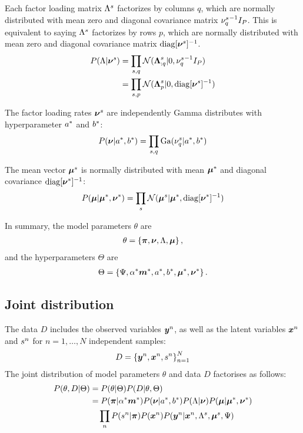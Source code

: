 \documentclass[a4paper]{article}
\begin{document}
Each factor loading matrix $\Lambda^s$ factorizes by columns $q$, which are normally distributed with mean zero and diagonal covariance matrix ${\nu^s_q}^{-1}I_P$. This is equivalent to saying $\Lambda^s$ factorizes by rows $p$, which are normally distributed with mean zero and diagonal covariance matrix $\operatorname{diag}[\boldsymbol{\nu}^s]^{-1}$.
\begin{align}
  P(\Lambda|\boldsymbol{\nu}^s)&=\prod_{s,q}\mathcal{N}(\boldsymbol{\Lambda}^s_{:q}|0,{\nu^s_q}^{-1}I_P) \\
                &=\prod_{s,p}\mathcal{N}(\boldsymbol{\Lambda}^s_p|0,\operatorname{diag}[\boldsymbol{\nu}^s]^{-1})
\end{align}

The factor loading rates $\boldsymbol{\nu}^s$ are independently Gamma distributes with hyperparameter $a^*$ and $b^*$:
\begin{align}
  P(\boldsymbol{\nu}|a^*,b^*)=\prod_{s,q}\operatorname{Ga}(\nu^s_q|a^*,b^*)
\end{align}

The mean vector $\boldsymbol{\mu}^s$ is normally distributed with mean $\boldsymbol{\mu}^*$ and diagonal covariance $\operatorname{diag}[\boldsymbol{\nu}^*]^{-1}$:
\begin{align}
  P(\boldsymbol{\mu}|\boldsymbol{\mu}^*,\boldsymbol{\nu}^*)=\prod_s\mathcal{N}(\boldsymbol{\mu}^s|\boldsymbol{\mu}^*,\operatorname{diag}[\boldsymbol{\nu}^*]^{-1})
\end{align}

In summary, the model parameters $\theta$ are
\begin{align}
  \theta=\left\{\boldsymbol{\pi},\boldsymbol{\nu},\Lambda,\boldsymbol{\mu}\right\},
\end{align}
and the hyperparameters $\Theta$ are
\begin{align}
  \Theta=\left\{\Psi,\alpha^*\boldsymbol{m}^*,a^*,b^*,\boldsymbol{\mu}^*,\boldsymbol{\nu}^*\right\}.
\end{align}

\subsection{Joint distribution}
The data $D$ includes the observed variables $\boldsymbol{y}^n$, as well as the latent variables $\boldsymbol{x}^n$ and $s^n$ for $n=1,\dots,N$ independent samples:
\begin{align}
  D=\left\{\boldsymbol{y}^n,\boldsymbol{x}^n,s^n\right\}_{n=1}^N
\end{align}
The joint distribution of model parameters $\theta$ and data $D$ factorises as follows:
\begin{align}
  P(\theta,D|\Theta)&=P(\theta|\Theta)P(D|\theta,\Theta) \\
  &=P(\boldsymbol{\pi}|\alpha^*\boldsymbol{m}^*)P(\boldsymbol{\nu}|a^*,b^*)P(\Lambda|\boldsymbol{\nu})P(\boldsymbol{\mu}|\boldsymbol{\mu}^*,\boldsymbol{\nu}^*) \\
  &\quad \prod_n P(s^n|\boldsymbol{\pi})P(\boldsymbol{x}^n)P(\boldsymbol{y}^n|\boldsymbol{x}^n,\Lambda^s,\boldsymbol{\mu}^s,\Psi)
\end{align}
\end{document}
